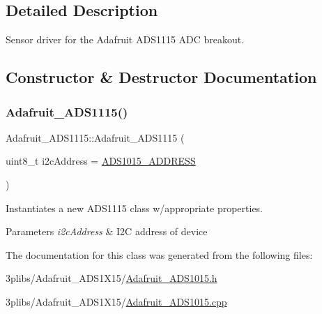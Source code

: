 \subsection{Detailed Description}
Sensor driver for the Adafruit A\+D\+S1115 A\+DC breakout. 

\subsection{Constructor \& Destructor Documentation}
\mbox{\label{class_adafruit___a_d_s1115_a7058cf2c75b673fb0b0a8936c3edd1fd}} 
\subsubsection{\texorpdfstring{Adafruit\+\_\+\+A\+D\+S1115()}{Adafruit\_ADS1115()}}
{\footnotesize\ttfamily Adafruit\+\_\+\+A\+D\+S1115\+::\+Adafruit\+\_\+\+A\+D\+S1115 (\begin{DoxyParamCaption}\item[{uint8\+\_\+t}]{i2c\+Address = {\ttfamily \hyperlink{_adafruit___a_d_s1015_8h_ae55d158023984e8f0ddc80b58d5b30dc}{A\+D\+S1015\+\_\+\+A\+D\+D\+R\+E\+SS}} }\end{DoxyParamCaption})}



Instantiates a new A\+D\+S1115 class w/appropriate properties. 


\begin{DoxyParams}{Parameters}
{\em i2c\+Address} & I2C address of device \\
\hline
\end{DoxyParams}


The documentation for this class was generated from the following files\+:\begin{DoxyCompactItemize}
\item 
3plibs/\+Adafruit\+\_\+\+A\+D\+S1\+X15/\hyperlink{_adafruit___a_d_s1015_8h}{Adafruit\+\_\+\+A\+D\+S1015.\+h}\item 
3plibs/\+Adafruit\+\_\+\+A\+D\+S1\+X15/\hyperlink{_adafruit___a_d_s1015_8cpp}{Adafruit\+\_\+\+A\+D\+S1015.\+cpp}\end{DoxyCompactItemize}
